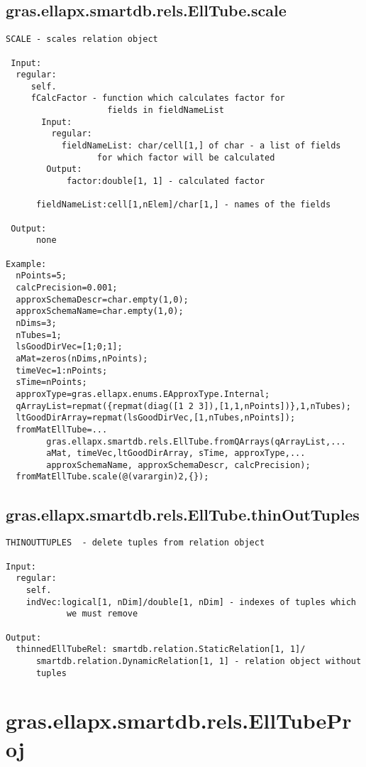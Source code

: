 \subsection{\texorpdfstring{gras.ellapx.smartdb.rels.EllTube.scale}{scale}}\label{method:gras.ellapx.smartdb.rels.EllTube.scale}
\begin{verbatim}
SCALE - scales relation object

 Input:
  regular:
     self.
     fCalcFactor - function which calculates factor for
                    fields in fieldNameList
       Input:
         regular:
           fieldNameList: char/cell[1,] of char - a list of fields
                  for which factor will be calculated
        Output:
            factor:double[1, 1] - calculated factor

      fieldNameList:cell[1,nElem]/char[1,] - names of the fields

 Output:
      none

Example:
  nPoints=5;
  calcPrecision=0.001;
  approxSchemaDescr=char.empty(1,0);
  approxSchemaName=char.empty(1,0);
  nDims=3;
  nTubes=1;
  lsGoodDirVec=[1;0;1];
  aMat=zeros(nDims,nPoints);
  timeVec=1:nPoints;
  sTime=nPoints;
  approxType=gras.ellapx.enums.EApproxType.Internal;
  qArrayList=repmat({repmat(diag([1 2 3]),[1,1,nPoints])},1,nTubes);
  ltGoodDirArray=repmat(lsGoodDirVec,[1,nTubes,nPoints]);
  fromMatEllTube=...
        gras.ellapx.smartdb.rels.EllTube.fromQArrays(qArrayList,...
        aMat, timeVec,ltGoodDirArray, sTime, approxType,...
        approxSchemaName, approxSchemaDescr, calcPrecision);
  fromMatEllTube.scale(@(varargin)2,{});
\end{verbatim}
\subsection{\texorpdfstring{gras.ellapx.smartdb.rels.EllTube.thinOutTuples}{thinOutTuples}}\label{method:gras.ellapx.smartdb.rels.EllTube.thinOutTuples}
\begin{verbatim}
THINOUTTUPLES  - delete tuples from relation object

Input:
  regular:
    self.
    indVec:logical[1, nDim]/double[1, nDim] - indexes of tuples which
            we must remove

Output:
  thinnedEllTubeRel: smartdb.relation.StaticRelation[1, 1]/
      smartdb.relation.DynamicRelation[1, 1] - relation object without
      tuples
\end{verbatim}
\section{gras.ellapx.smartdb.rels.EllTubeProj}\label{secClassDescr:gras.ellapx.smartdb.rels.EllTubeProj}
